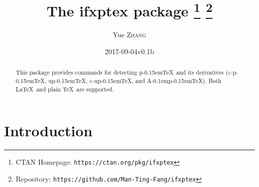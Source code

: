 \documentclass[a4paper]{article}
\newcommand\NormalSans{\normalfont\sffamily}
\newcommand\pkg[1]{{\protect\NormalSans#1}}
\newcommand\pTeX{p\kern-0.15em\TeX}
\newcommand\e{\ensuremath{\varepsilon}}
\newcommand\epTeX{\e-\pTeX}
\newcommand\upTeX{u\pTeX}
\newcommand\eupTeX{\e-\upTeX}
\newcommand\ApTeX{A\kern-0.1em\pTeX}
\begin{document}
\title{The \pkg{ifxptex} package%
  \thanks{CTAN Homepage: \texttt{https://ctan.org/pkg/ifxptex}}
  \thanks{Repository: \texttt{https://github.com/Man-Ting-Fang/ifxptex}}}
\author{Yue \textsc{Zhang}}
\date{2017-09-04\quad v0.1b}

\maketitle

\begin{abstract}
This package provides commands for detecting \pTeX\ and its derivatives (\epTeX,
\upTeX, \eupTeX, and \ApTeX). Both \LaTeX\ and plain \TeX\ are supported.
\end{abstract}

\section{Introduction}
\end{document}
